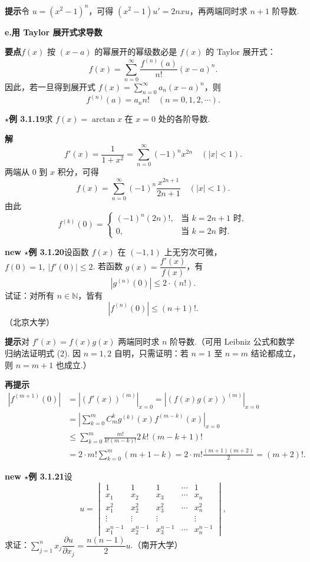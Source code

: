 \documentclass[UTF8, 12pt, fontset=fandol, oneside]{ctexart}
\begin{document}
\noindent\textbf{提示}\quad 令 $u=(x^2-1)^n$，可得 $(x^2-1)u'=2nxu$，再两端同时求 $n+1$ 阶导数.

\noindent\textbf{e.\quad 用 Taylor 展开式求导数}

\noindent\textbf{要点}\quad $f(x)$ 按 $(x-a)$ 的幂展开的幂级数必是 $f(x)$ 的 Taylor 展开式：
\[
  f(x)=\sum_{n=0}^\infty\frac{f^{(n)}(a)}{n!}(x-a)^n.
\]
因此，若一旦得到展开式 $f(x)=\sum\limits_{n=0}^\infty a_n(x-a)^n$，则
\[
  f^{(n)}(a)=a_n n!\quad(n=0,1,2,\cdots).
\]

\noindent\textbf{$\star$例 3.1.19}\quad 求 $f(x)=\arctan x$ 在 $x=0$ 处的各阶导数.

\noindent\textbf{解}\quad
\[
  f'(x)=\frac1{1+x^2}=\sum_{n=0}^\infty(-1)^n x^{2n}\quad(|x|<1).
\]
两端从 $0$ 到 $x$ 积分，可得
\[
  f(x)=\sum_{n=0}^\infty(-1)^n\frac{x^{2n+1}}{2n+1}\quad(|x|<1).
\]
由此
\[
f^{(k)}(0)=
\begin{cases}
(-1)^n(2n)!, & \text{当 }k=2n+1\text{ 时},\\
0, & \text{当 }k=2n\text{ 时}.
\end{cases}
\]

\noindent\textbf{new $\star$例 3.1.20}\quad 设函数 $f(x)$ 在 $(-1,1)$ 上无穷次可微，$f(0)=1,\ |f'(0)|\le2$. 若函数 $g(x)=\dfrac{f'(x)}{f(x)}$，有
\begin{equation}
  |g^{(n)}(0)|\le2\cdot(n!).
\tag{1}
\end{equation}
试证：对所有 $n\in\mathbb N$，皆有
\begin{equation}
  |f^{(n)}(0)|\le(n+1)!.
\tag{2}
\end{equation}
（北京大学）

\noindent\textbf{提示}\quad 对 $f'(x)=f(x)g(x)$ 两端同时求 $n$ 阶导数.（可用 Leibniz 公式和数学归纳法证明式 (2). 因 $n=1,2$ 自明，只需证明：若 $n=1$ 至 $n=m$ 结论都成立，则 $n=m+1$ 也成立.）

\noindent\textbf{再提示}\quad
\[
\begin{aligned}
|f^{(m+1)}(0)|
&=|(f'(x))^{(m)}|_{x=0}
=|(f(x)g(x))^{(m)}|_{x=0}\\
&=\left|\sum_{k=0}^m C_m^k g^{(k)}(x)f^{(m-k)}(x)\right|_{x=0}\\
&\le\sum_{k=0}^m\frac{m!}{k!(m-k)!}2\,k!\,(m-k+1)!\\
&=2\cdot m!\sum_{k=0}^m(m+1-k)
=2\cdot m!\frac{(m+1)(m+2)}2=(m+2)!.
\end{aligned}
\]

\noindent\textbf{new $\star$例 3.1.21}\quad 设
\begin{equation}
u=
\begin{vmatrix}
1&1&1&\cdots&1\\
x_1&x_2&x_3&\cdots&x_n\\
x_1^2&x_2^2&x_3^2&\cdots&x_n^2\\
\vdots&\vdots&\vdots& &\vdots\\
x_1^{n-1}&x_2^{n-1}&x_3^{n-1}&\cdots&x_n^{n-1}
\end{vmatrix},
\tag{1}
\end{equation}
求证：$\sum\limits_{j=1}^n x_j\dfrac{\partial u}{\partial x_j}=\dfrac{n(n-1)}2u$.（南开大学）
\end{document}
